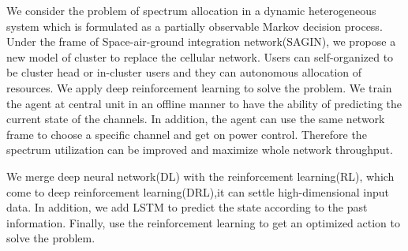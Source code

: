 \begin{eabstract}
   
   We consider the problem of spectrum allocation in a dynamic heterogeneous system which is formulated as a partially observable Markov decision process. Under the frame of Space-air-ground integration network(SAGIN), we propose a new model of cluster to replace the cellular network. Users can self-organized to be cluster head or in-cluster users and they can autonomous allocation of resources. We apply deep reinforcement learning to solve the problem. We train the agent at central unit in an offline manner to have the ability of predicting the current state of the channels. In addition, the agent can use the same network frame to choose a specific channel and get on power control. Therefore the spectrum utilization can be improved and maximize whole network throughput.
   
   We merge deep neural network(DL) with the reinforcement learning(RL), which come to deep reinforcement learning(DRL),it can settle high-dimensional input data. In addition, we add LSTM to predict the state according to the past information. Finally, use the reinforcement learning to get an optimized action to solve the problem. 

   
\end{eabstract}
